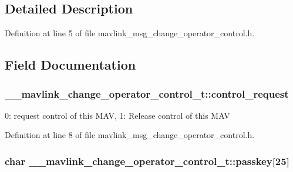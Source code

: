 \subsection{Detailed Description}


Definition at line 5 of file mavlink\-\_\-msg\-\_\-change\-\_\-operator\-\_\-control.\-h.



\subsection{Field Documentation}
\hypertarget{struct____mavlink__change__operator__control__t_aef19fec531d51e7a3f57fe09a7f74c06}{
\subsubsection[{control\-\_\-request}]{ \-\_\-\-\_\-mavlink\-\_\-change\-\_\-operator\-\_\-control\-\_\-t\-::control\-\_\-request}}\label{struct____mavlink__change__operator__control__t_aef19fec531d51e7a3f57fe09a7f74c06}


0\-: request control of this M\-A\-V, 1\-: Release control of this M\-A\-V 



Definition at line 8 of file mavlink\-\_\-msg\-\_\-change\-\_\-operator\-\_\-control.\-h.

\hypertarget{struct____mavlink__change__operator__control__t_ad18d971feb4c5e1826c0f6fde0085ab0}{
\subsubsection[{passkey}]{\setlength{\rightskip}{0pt plus 5cm}char \-\_\-\-\_\-mavlink\-\_\-change\-\_\-operator\-\_\-control\-\_\-t\-::passkey\mbox{[}25\mbox{]}}}\label{struct____mavlink__change__operator__control__t_ad18d971feb4c5e1826c0f6fde0085ab0}


